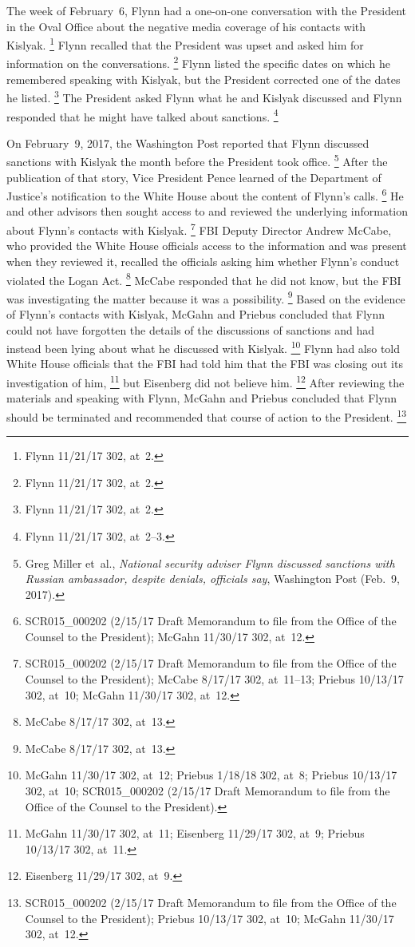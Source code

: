 The week of February~6, Flynn had a one-on-one conversation with the President in the Oval Office about the negative media coverage of his contacts with Kislyak.%
\footnote{Flynn 11/21/17 302, at~2.}
Flynn recalled that the President was upset and asked him for information on the conversations.%
\footnote{Flynn 11/21/17 302, at~2.}
Flynn listed the specific dates on which he remembered speaking with Kislyak, but the President corrected one of the dates he listed.%
\footnote{Flynn 11/21/17 302, at~2.}
The President asked Flynn what he and Kislyak discussed and Flynn responded that he might have talked about sanctions.%
\footnote{Flynn 11/21/17 302, at~2--3.}

On February~9, 2017, the Washington Post reported that Flynn discussed sanctions with Kislyak the month before the President took office.%
\footnote{Greg Miller et~al., \textit{National security adviser Flynn discussed sanctions with Russian ambassador, despite denials, officials say}, Washington Post (Feb.~9, 2017).}
After the publication of that story, Vice President Pence learned of the Department of Justice's notification to the White House about the content of Flynn's calls.%
\footnote{SCR015\_000202 (2/15/17 Draft Memorandum to file from the Office of the Counsel to the President); McGahn 11/30/17 302, at~12.}
He and other advisors then sought access to and reviewed the underlying information about Flynn's contacts with Kislyak.%
\footnote{SCR015\_000202 (2/15/17 Draft Memorandum to file from the Office of the Counsel to the President);
McCabe 8/17/17 302, at~11--13;
Priebus 10/13/17 302, at~10;
McGahn 11/30/17 302, at~12.}
FBI Deputy Director Andrew McCabe, who provided the White House officials access to the information and was present when they reviewed it, recalled the officials asking him whether Flynn's conduct violated the Logan Act.%
\footnote{McCabe 8/17/17 302, at~13.}
McCabe responded that he did not know, but the FBI was investigating the matter because it was a possibility.%
\footnote{McCabe 8/17/17 302, at~13.}
Based on the evidence of Flynn's contacts with Kislyak, McGahn and Priebus concluded that Flynn could not have forgotten the details of the discussions of sanctions and had instead been lying about what he discussed with Kislyak.%
\footnote{McGahn 11/30/17 302, at~12;
Priebus 1/18/18 302, at~8;
Priebus 10/13/17 302, at~10;
SCR015\_000202 (2/15/17 Draft Memorandum to file from the Office of the Counsel to the President).}
Flynn had also told White House officials that the FBI had told him that the FBI was closing out its investigation of him,%
\footnote{McGahn 11/30/17 302, at~11;
Eisenberg 11/29/17 302, at~9;
Priebus 10/13/17 302, at~11.}
but Eisenberg did not believe him.%
\footnote{Eisenberg 11/29/17 302, at~9.}
After reviewing the materials and speaking with Flynn, McGahn and Priebus concluded that Flynn should be terminated and recommended that course of action to the President.%
\footnote{SCR015\_000202 (2/15/17 Draft Memorandum to file from the Office of the Counsel to the President);
Priebus 10/13/17 302, at~10;
McGahn 11/30/17 302, at~12.}

